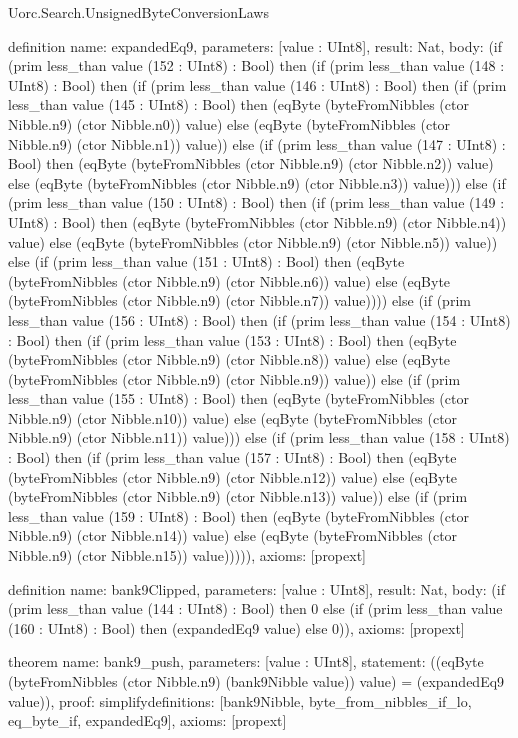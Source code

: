 \begin{lexlean}{Uorc.Search.UnsignedByteConversionLaws}
\begin{semanticmodule}
definition{
  name: expandedEq9,
  parameters: [value : UInt8],
  result: Nat,
  body: (if (prim less_than value (152 : UInt8) : Bool) then (if (prim less_than value (148 : UInt8) : Bool) then (if (prim less_than value (146 : UInt8) : Bool) then (if (prim less_than value (145 : UInt8) : Bool) then (eqByte (byteFromNibbles (ctor Nibble.n9) (ctor Nibble.n0)) value) else (eqByte (byteFromNibbles (ctor Nibble.n9) (ctor Nibble.n1)) value)) else (if (prim less_than value (147 : UInt8) : Bool) then (eqByte (byteFromNibbles (ctor Nibble.n9) (ctor Nibble.n2)) value) else (eqByte (byteFromNibbles (ctor Nibble.n9) (ctor Nibble.n3)) value))) else (if (prim less_than value (150 : UInt8) : Bool) then (if (prim less_than value (149 : UInt8) : Bool) then (eqByte (byteFromNibbles (ctor Nibble.n9) (ctor Nibble.n4)) value) else (eqByte (byteFromNibbles (ctor Nibble.n9) (ctor Nibble.n5)) value)) else (if (prim less_than value (151 : UInt8) : Bool) then (eqByte (byteFromNibbles (ctor Nibble.n9) (ctor Nibble.n6)) value) else (eqByte (byteFromNibbles (ctor Nibble.n9) (ctor Nibble.n7)) value)))) else (if (prim less_than value (156 : UInt8) : Bool) then (if (prim less_than value (154 : UInt8) : Bool) then (if (prim less_than value (153 : UInt8) : Bool) then (eqByte (byteFromNibbles (ctor Nibble.n9) (ctor Nibble.n8)) value) else (eqByte (byteFromNibbles (ctor Nibble.n9) (ctor Nibble.n9)) value)) else (if (prim less_than value (155 : UInt8) : Bool) then (eqByte (byteFromNibbles (ctor Nibble.n9) (ctor Nibble.n10)) value) else (eqByte (byteFromNibbles (ctor Nibble.n9) (ctor Nibble.n11)) value))) else (if (prim less_than value (158 : UInt8) : Bool) then (if (prim less_than value (157 : UInt8) : Bool) then (eqByte (byteFromNibbles (ctor Nibble.n9) (ctor Nibble.n12)) value) else (eqByte (byteFromNibbles (ctor Nibble.n9) (ctor Nibble.n13)) value)) else (if (prim less_than value (159 : UInt8) : Bool) then (eqByte (byteFromNibbles (ctor Nibble.n9) (ctor Nibble.n14)) value) else (eqByte (byteFromNibbles (ctor Nibble.n9) (ctor Nibble.n15)) value))))),
  axioms: [propext]
}

definition{
  name: bank9Clipped,
  parameters: [value : UInt8],
  result: Nat,
  body: (if (prim less_than value (144 : UInt8) : Bool) then 0 else (if (prim less_than value (160 : UInt8) : Bool) then (expandedEq9 value) else 0)),
  axioms: [propext]
}

theorem{
  name: bank9_push,
  parameters: [value : UInt8],
  statement: ((eqByte (byteFromNibbles (ctor Nibble.n9) (bank9Nibble value)) value) = (expandedEq9 value)),
  proof: simplify{definitions: [bank9Nibble, byte_from_nibbles_if_lo, eq_byte_if, expandedEq9]},
  axioms: [propext]
}


\end{semanticmodule}
\end{lexlean}
